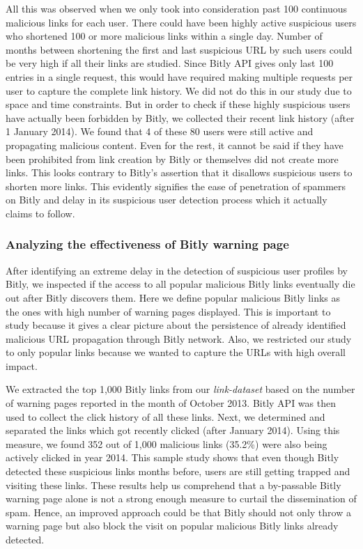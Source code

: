 \documentclass[conference]{IEEEtran}
\begin{document}
All this was observed when we only took into consideration past 100 continuous malicious links for each user. There could have been highly active suspicious users who shortened 100 or more malicious links within a single day. Number of months between shortening the first and last suspicious URL by such users could be very high if all their links are studied. Since Bitly API gives only last 100 entries in a single request, this would have required making multiple requests per user to capture the complete link history. We did not do this in our study due to space and time constraints. But in order to check if these highly suspicious users have actually been forbidden by Bitly, we collected their recent link history (after 1 January 2014). We found that 4 of these 80 users were still active and propagating malicious content. Even for the rest, it cannot be said if they have been prohibited from link creation by Bitly or themselves did not create more links. This looks contrary to Bitly's assertion that it disallows suspicious users to shorten more links. This evidently signifies the ease of penetration of spammers on Bitly and delay in its suspicious user detection process which it actually claims to follow.
\subsubsection{Analyzing the effectiveness of Bitly warning page}
After identifying an extreme delay in the detection of suspicious user profiles by Bitly, we inspected if the access to all popular malicious Bitly links eventually die out after Bitly discovers them. Here we define popular malicious Bitly links as the ones with high number of warning pages displayed. This is important to study because it gives a clear picture about the persistence of already identified malicious URL propagation through Bitly network. Also, we restricted our study to only popular links because we wanted to capture the URLs with high overall impact. 

We extracted the top 1,000 Bitly links from our \textit{link-dataset} based on the number of warning pages reported in the month of October 2013. Bitly API was then used to collect the click history of all these links. Next, we determined and separated the links which got recently clicked (after January 2014). Using this measure, we found 352 out of 1,000 malicious links (35.2\%) were also being actively clicked in year 2014. This sample study shows that even though Bitly detected these suspicious links months before, users are still getting trapped and visiting these links. These results help us comprehend that a by-passable Bitly warning page alone is not a strong enough measure to curtail the dissemination of spam. Hence, an improved approach could be that Bitly should not only throw a warning page but also block the visit on popular malicious Bitly links already detected. 
\end{document}
